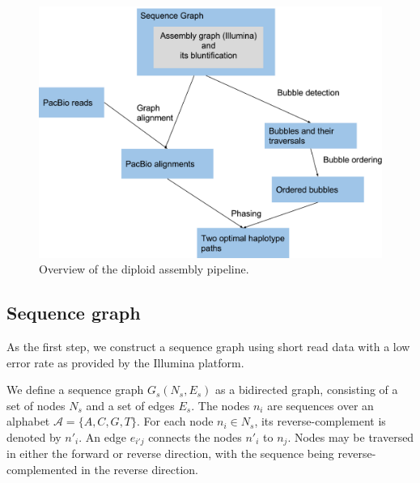 \begin{figure}[t!]\centering
\includegraphics[width=\columnwidth]{pipeline.pdf}
\caption{Overview of the diploid assembly pipeline. }
\label{fig:pipeline}
\end{figure}

\subsection{Sequence graph} 
As the first step, we construct a sequence graph using short read data with a low error rate as provided by the Illumina platform.
\begin{definition}
We define a sequence graph $G_s (N_s, E_s)$ as a bidirected graph, consisting of a set of nodes $N_s$ and a set of edges $E_s$.
The nodes $n_i$ are sequences over an alphabet $\mathcal{A} = \{A,C,G,T\}$.
For each node $n_i \in N_s$, its reverse-complement is denoted by $n'_i$.
An edge $e_{i'j}$ connects the nodes $n'_i$ to $n_j$. 
Nodes may be traversed in either the forward or reverse direction, with the sequence being reverse-complemented in the reverse direction. 
\end{definition}

